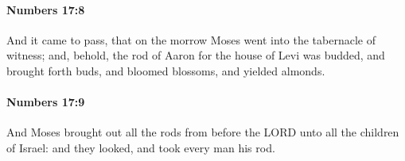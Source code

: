 		\paragraph{Numbers 17:8} %
			\label{NUMBERS-17-8}

			And it came to pass, that on the morrow Moses went into the tabernacle of witness; and, behold, the rod of Aaron for the house of Levi was budded, and brought forth buds, and bloomed blossoms, and yielded almonds.


		\paragraph{Numbers 17:9} %
			\label{NUMBERS-17-9}

			And Moses brought out all the rods from before the LORD unto all the children of Israel: and they looked, and took every man his rod.


